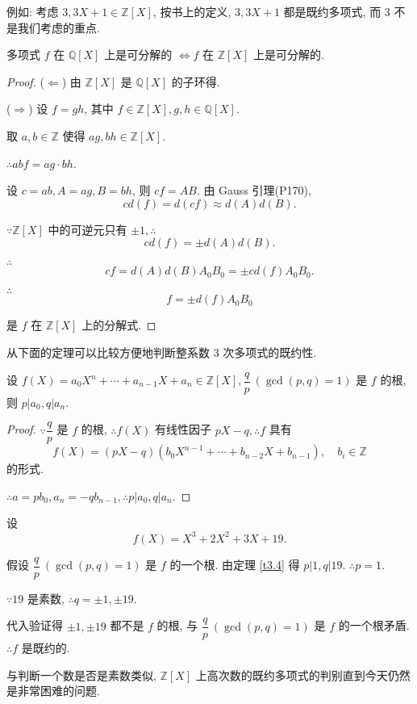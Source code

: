 \documentclass[color=black,device=normal,lang=cn,mode=geye]{elegantnote}
\begin{document}
例如: 考虑 $3,3X+1\in\mathbb{Z}[X]$, 按书上的定义, $3,3X+1$ 都是既约多项式, 而 $3$ 不是我们考虑的重点.
\begin{theorem}[书上推论的推广]\label{t3.3}
    多项式 $f$ 在 $\mathbb{Q}[X]$ 上是可分解的 $\Leftrightarrow f$ 在 $\mathbb{Z}[X]$ 上是可分解的. 
\end{theorem}
\begin{proof}
    ($\Leftarrow$) 由 $\mathbb{Z}[X]$ 是 $\mathbb{Q}[X]$ 的子环得.

    ($\Rightarrow$) 设 $f=gh$, 其中 $f\in\mathbb{Z}[X],g,h\in\mathbb{Q}[X]$.

    取 $a,b\in\mathbb{Z}$ 使得 $ag,bh\in\mathbb{Z}[X]$.

    $\therefore abf=ag\cdot bh$.

    设 $c=ab,A=ag,B=bh$, 则 $cf=AB$. 由 Gauss 引理(P170),
    \[cd(f)=d(cf)\approx d(A)d(B).\]

    $\because\mathbb{Z}[X]$ 中的可逆元只有 $\pm1,\therefore$
    \[cd(f)=\pm d(A)d(B).\]

    $\therefore$
    \[cf=d(A)d(B)A_0B_0=\pm cd(f)A_0B_0.\]

    $\therefore$
    \[f=\pm d(f)A_0B_0\]

    是 $f$ 在 $\mathbb{Z}[X]$ 上的分解式.
\end{proof}
从下面的定理可以比较方便地判断整系数 $3$ 次多项式的既约性.
\begin{theorem}\label{t3.4}
    设 $f(X)=a_0X^n+\cdots+a_{n-1}X+a_n\in\mathbb{Z}[X],\dfrac{q}{p}\ (\gcd(p,q)=1)$ 是 $f$ 的根, 则 $p|a_0,q|a_n$.
\end{theorem}
\begin{proof}
    $\because\dfrac{q}{p}$ 是 $f$ 的根, $\therefore f(X)$ 有线性因子 $pX-q,\therefore f$ 具有
    \[f(X)=(pX-q)(b_0X^{n-1}+\cdots+b_{n-2}X+b_{n-1}),\quad b_i\in\mathbb{Z}\]
    的形式.

    $\therefore a=pb_0,a_n=-qb_{n-1},\therefore p|a_0,q|a_n$.
\end{proof}
\begin{example}
    设
    \[f(X)=X^3+2X^2+3X+19.\]

    假设 $\dfrac{q}{p}\ (\gcd(p,q)=1)$ 是 $f$ 的一个根. 由定理 \ref{t3.4} 得 $p|1,q|19$. $\therefore p=1$.

    $\because19$ 是素数, $\therefore q=\pm1,\pm19$.

    代入验证得 $\pm1,\pm19$ 都不是 $f$ 的根, 与 $\dfrac{q}{p}\ (\gcd(p,q)=1)$ 是 $f$ 的一个根矛盾. $\therefore f$ 是既约的.
\end{example}
与判断一个数是否是素数类似, $\mathbb{Z}[X]$ 上高次数的既约多项式的判别直到今天仍然是非常困难的问题.
\end{document}
